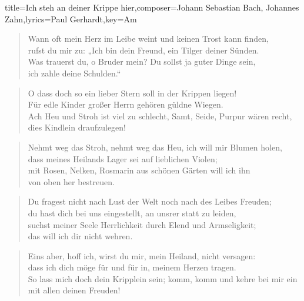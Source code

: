 \documentclass{leadsheet-modern}
\begin{document}
\begin{song}{title={Ich steh an deiner Krippe hier},composer={Johann Sebastian Bach, Johannes Zahn},lyrics={Paul Gerhardt},key={Am}}
\begin{verse}
Wann oft mein Herz im Leibe weint 
und keinen Trost kann finden, \\
rufst du mir zu: „Ich bin dein Freund, 
ein Tilger deiner Sünden. \\
Was trauerst du, o Bruder mein? 
Du sollst ja guter Dinge sein, \\
ich zahle deine Schulden.“ 
\end{verse}

\begin{verse}
O dass doch so ein lieber Stern 
soll in der Krippen liegen! \\
Für edle Kinder großer Herrn 
gehören güldne Wiegen. \\
Ach Heu und Stroh ist viel zu schlecht, 
Samt, Seide, Purpur wären recht, \\
dies Kindlein draufzulegen! 
\end{verse}

\begin{verse}
Nehmt weg das Stroh, nehmt weg das Heu, 
ich will mir Blumen holen, \\
dass meines Heilands Lager sei 
auf lieblichen Violen; \\
mit Rosen, Nelken, Rosmarin 
aus schönen Gärten will ich ihn \\
von oben her bestreuen. 
\end{verse}

\begin{verse}
Du fragest nicht nach Lust der Welt 
noch nach des Leibes Freuden; \\
du hast dich bei uns eingestellt, 
an unsrer statt zu leiden, \\
suchst meiner Seele Herrlichkeit 
durch Elend und Armseligkeit; \\
das will ich dir nicht wehren. 
\end{verse}

\begin{verse}
Eins aber, hoff ich, wirst du mir, 
mein Heiland, nicht versagen: \\
dass ich dich möge für und für 
in, meinem Herzen tragen. \\
So lass mich doch dein Kripplein sein; 
komm, komm und kehre bei mir ein \\
mit allen deinen Freuden! 
\end{verse}

\end{song}
\end{document}
